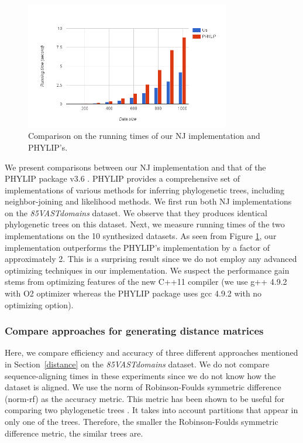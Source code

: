 \documentclass[11pt,letterpaper]{article}
\theoremstyle{definition}
\begin{document}
\begin{figure}[t]
  \centering
  \includegraphics[width=0.8\textwidth]{runningtime.png}
  \caption{Comparison on the running times of our NJ implementation and PHYLIP's.}
  \label{fig:runningtime}
\end{figure}


We present comparisons between our NJ implementation and that of the PHYLIP package v3.6 \cite{felsenstein2005phylip}. PHYLIP provides a comprehensive set of implementations of various methods for inferring phylogenetic trees, including neighbor-joining and likelihood methods. We first run both NJ implementations on the \textit{85VASTdomains} dataset. We observe that they produces identical phylogenetic trees on this dataset. Next, we measure running times of the two implementations on the 10 synthesized datasets. As seen from Figure \ref{fig:runningtime}, our implementation outperforms the PHYLIP's implementation by a factor of approximately 2. This is a surprising result since we do not employ any advanced optimizing techniques in our implementation. We suspect the performance gain stems from optimizing features of the new C++11 compiler (we use g++ 4.9.2 with O2 optimizer whereas the PHYLIP package uses gcc 4.9.2 with no optimizing option).  


\subsubsection{Compare approaches for generating distance matrices}

Here, we compare efficiency and accuracy of three different approaches mentioned in Section~\ref{distance} on the \textit{85VASTdomains} dataset. We do not compare sequence-aligning times in these experiments since we do not know how the dataset is aligned.
We use the norm of Robinson-Foulds symmetric difference (norm-rf) as the accuracy metric. This metric has been shown to be useful for comparing two phylogenetic trees \cite{robinson1981comparison}. It takes into account partitions that appear in only one of the trees. Therefore, the smaller the Robinson-Foulds symmetric difference metric, the similar trees are.
\end{document}
